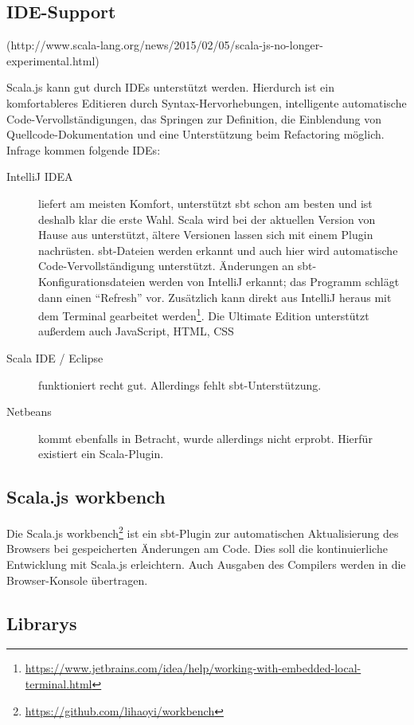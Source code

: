 \documentclass[a4paper, 12pt, hidelinks, listof=totoc, listoftables=totoc, bibliography=totoc]{scrreprt}
\begin{document}
\subsection{IDE-Support}\label{subsec:sjs-ide}
(http://www.scala-lang.org/news/2015/02/05/scala-js-no-longer-experimental.html)

Scala.js kann gut durch \ac{IDE}s unterstützt werden. Hierdurch ist ein komfortableres Editieren durch Syntax-Hervorhebungen, intelligente automatische Code-Vervollständigungen, das Springen zur Definition, die Einblendung von Quellcode-Dokumentation und eine Unterstützung beim Refactoring möglich. \cite{doeraene2015.SNL} Infrage kommen folgende \ac{IDE}s:

\begin{description}
	\item[IntelliJ IDEA] liefert am meisten Komfort, unterstützt sbt schon am besten und ist deshalb klar die erste Wahl. Scala wird bei der aktuellen Version von Hause aus unterstützt, ältere Versionen lassen sich mit einem Plugin nachrüsten. sbt-Dateien werden erkannt und auch hier wird automatische Code-Vervollständigung unterstützt. Änderungen an sbt-Konfigurationsdateien werden von IntelliJ erkannt; das Programm schlägt dann einen "`Refresh"' vor. Zusätzlich kann direkt aus IntelliJ heraus mit dem Terminal gearbeitet werden\footnote{\url{https://www.jetbrains.com/idea/help/working-with-embedded-local-terminal.html}}. Die Ultimate Edition unterstützt außerdem auch JavaScript, \ac{HTML}, \ac{CSS}
	\item[Scala IDE / Eclipse] funktioniert recht gut. Allerdings fehlt sbt-Unterstützung.
	\item[Netbeans] kommt ebenfalls in Betracht, wurde allerdings nicht erprobt. Hierfür existiert ein Scala-Plugin.
\end{description}



\subsection{Scala.js workbench}

Die Scala.js workbench\footnote{\url{https://github.com/lihaoyi/workbench}} ist ein sbt-Plugin zur automatischen Aktualisierung des Browsers 
bei gespeicherten Änderungen am Code. Dies soll die kontinuierliche Entwicklung mit Scala.js erleichtern. Auch Ausgaben des Compilers werden in die Browser-Konsole übertragen.


\subsection{Librarys}
\end{document}
